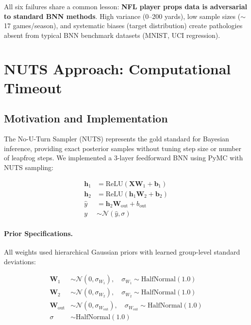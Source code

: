 All six failures share a common lesson: \textbf{NFL player props data is adversarial to standard BNN methods}. High variance (0--200 yards), low sample sizes ($\sim$17 games/season), and systematic biases (target distribution) create pathologies absent from typical BNN benchmark datasets (MNIST, UCI regression).

\section{NUTS Approach: Computational Timeout}

\subsection{Motivation and Implementation}

The No-U-Turn Sampler (NUTS) represents the gold standard for Bayesian inference, providing exact posterior samples without tuning step size or number of leapfrog steps. We implemented a 3-layer feedforward BNN using PyMC with NUTS sampling:

\begin{align}
\mathbf{h}_1 &= \text{ReLU}(\mathbf{X} \mathbf{W}_1 + \mathbf{b}_1) \\
\mathbf{h}_2 &= \text{ReLU}(\mathbf{h}_1 \mathbf{W}_2 + \mathbf{b}_2) \\
\hat{y} &= \mathbf{h}_2 \mathbf{W}_{\text{out}} + b_{\text{out}} \\
y &\sim \mathcal{N}(\hat{y}, \sigma)
\end{align}

\paragraph{Prior Specifications.}
All weights used hierarchical Gaussian priors with learned group-level standard deviations:

\begin{align}
\mathbf{W}_1 &\sim \mathcal{N}(0, \sigma_{W_1}), \quad \sigma_{W_1} \sim \text{HalfNormal}(1.0) \\
\mathbf{W}_2 &\sim \mathcal{N}(0, \sigma_{W_2}), \quad \sigma_{W_2} \sim \text{HalfNormal}(1.0) \\
\mathbf{W}_{\text{out}} &\sim \mathcal{N}(0, \sigma_{W_{\text{out}}}), \quad \sigma_{W_{\text{out}}} \sim \text{HalfNormal}(1.0) \\
\sigma &\sim \text{HalfNormal}(1.0)
\end{align}

